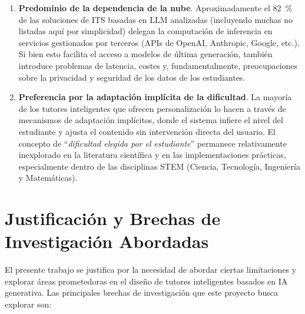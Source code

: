 \begin{enumerate}[label=\alph*),leftmargin=*]
  \item \textbf{Predominio de la dependencia de la nube}. Aproximadamente el \SI{82}{\percent} de las soluciones de ITS basadas en LLM analizadas (incluyendo muchas no listadas aquí por simplicidad) delegan la computación de inferencia en servicios gestionados por terceros (APIs de OpenAI, Anthropic, Google, etc.). Si bien esto facilita el acceso a modelos de última generación, también introduce problemas de latencia, costes y, fundamentalmente, preocupaciones sobre la privacidad y seguridad de los datos de los estudiantes.
  \item \textbf{Preferencia por la adaptación implícita de la dificultad}. La mayoría de los tutores inteligentes que ofrecen personalización lo hacen a través de mecanismos de adaptación implícitos, donde el sistema infiere el nivel del estudiante y ajusta el contenido sin intervención directa del usuario. El concepto de “\emph{dificultad elegida por el estudiante}” permanece relativamente inexplorado en la literatura científica y en las implementaciones prácticas, especialmente dentro de las disciplinas STEM (Ciencia, Tecnología, Ingeniería y Matemáticas).
\end{enumerate}

\section{Justificación y Brechas de Investigación Abordadas}
\label{sec:brecha_investigacion}

El presente trabajo se justifica por la necesidad de abordar ciertas limitaciones y explorar áreas prometedoras en el diseño de tutores inteligentes basados en IA generativa. Las principales brechas de investigación que este proyecto busca explorar son:

